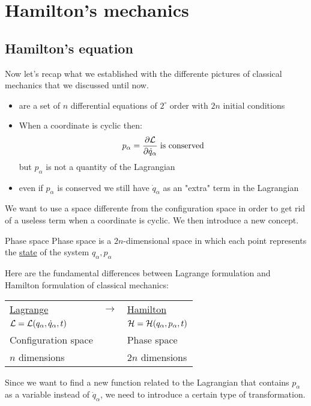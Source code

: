 \chapter{Hamilton's mechanics}
\section{Hamilton's equation}
Now let's recap what we established with the differente pictures of classical mechanics that we discussed until now.
\begin{itemize}
    \item \eleref\;are a set of $n$ differential equations of $2^\circ$ order with $2n$ initial conditions
    \item When a coordinate is cyclic then: \begin{equation}
        p_{\alpha} = \pdv{\lagr}{\dot{q}_{\alpha}}\;\text{is conserved}
    \end{equation}
    but $p_{\alpha}$ is not a quantity of the Lagrangian
    \item even if $p_\alpha$ is conserved we still have $\dot{q}_{\alpha}$ as an "extra" term in the Lagrangian
\end{itemize}
We want to use a space differente from the configuration space in order to get rid of a useless term when a coordinate is cyclic. We then introduce a new concept.
\begin{definition}{Phase space}
  Phase space is a $2n$-dimensional space in which each point represents the \underline{state} of the system ${q_{\alpha},p_{\alpha}}$
\end{definition}
Here are the fundamental differences between Lagrange formulation and Hamilton formulation of classical mechanics:
\begin{table}[H]
    \centering
    \begin{tabular}{lll}
        \underline{Lagrange} & $\longrightarrow$ &\underline{Hamilton}\\
        $\mathcal{L}=\mathcal{L}(q_{\alpha},\dot{q}_{\alpha},t)$ & &$\mathcal{H}=\mathcal{H}(q_{\alpha},p_{\alpha},t)$\\
        Configuration space & &Phase space\\
        $n$ dimensions & &$2n$ dimensions
    \end{tabular}
\end{table}
Since we want to find a new function related to the Lagrangian that contains $p_{\alpha}$ as a variable instead of $\dot{q}_{\alpha}$, we need to introduce a certain type of transformation.\\
